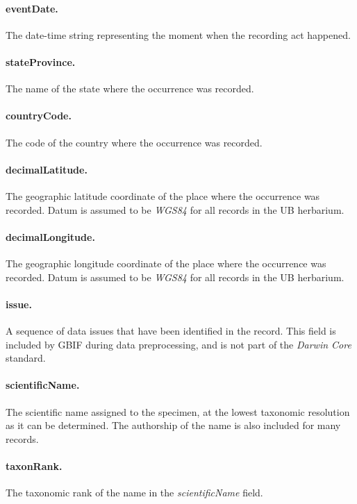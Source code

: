 \paragraph*{eventDate.} The date-time string representing the moment when the recording act happened.
%
\paragraph*{stateProvince.} The name of the state where the occurrence was recorded.

\paragraph*{countryCode.} The code of the country where the occurrence was recorded.

\paragraph*{decimalLatitude.} The geographic latitude coordinate of the place where the occurrence was recorded. 
Datum is assumed to be \textit{WGS84} for all records in the UB herbarium.

\paragraph*{decimalLongitude.} The geographic longitude coordinate of the place where the occurrence was recorded.
Datum is assumed to be \textit{WGS84} for all records in the UB herbarium.

\paragraph*{issue.} A sequence of data issues that have been identified in the record.
This field is included by GBIF during data preprocessing, and is not part of the \textit{Darwin Core} standard.%

\paragraph*{scientificName.} The scientific name assigned to the specimen, at the lowest taxonomic resolution as it can be determined. The authorship of the name is also included for many records.

\paragraph*{taxonRank.} The taxonomic rank of the name in the \textit{scientificName} field.
\\




